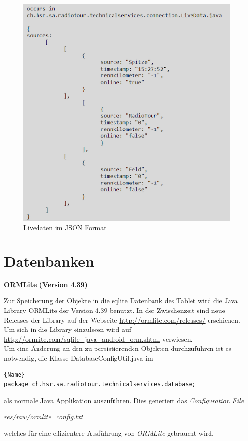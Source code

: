 \begin{figure}[H]
\caption{Livedaten im JSON Format}
\label{fig:jsonreceive}
\centering
\includegraphics[scale=0.9]{05bericht/images/json2.png}
\end{figure}

\newpage

\section{Datenbanken}
\textbf{ORMLite (Version 4.39)}

 
Zur Speicherung der Objekte in die \gls{sqlite} Datenbank des Tablet wird die Java Library ORMLite der Version 4.39 benutzt. In der Zwischenzeit sind neue Releases der Library auf der Webseite \url{http://ormlite.com/releases/} erschienen. Um sich in die Library einzulesen wird auf \url{http://ormlite.com/sqlite_java_android_orm.shtml} verwiesen.
\\
Um eine Änderung an den zu persistierenden Objekten durchzuführen ist es notwendig, die Klasse DatabaseConfigUtil.java im

\begin{lstlisting}{Name}
package ch.hsr.sa.radiotour.technicalservices.database;
\end{lstlisting}

als normale Java Applikation auszuführen. Dies generiert das \textit{Configuration File}

\textit{res/raw/ormlite\_config.txt}

welches für eine effizientere Ausführung von \textit{ORMLite} gebraucht wird.



